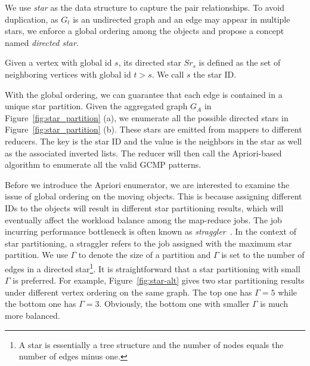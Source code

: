 We use \emph{star} as the data structure to capture the pair relationships. 
To avoid duplication, as $G_t$ is an undirected graph and an edge may appear in multiple stars, 
we enforce a global ordering among the objects and propose a concept named \textit{directed star}.

\begin{definition}
Given a vertex with global id $s$, its directed star $Sr_s$ is defined as the set of neighboring vertices with global id $t>s$. We call $s$ the star ID.
\end{definition}

With the global ordering, we can guarantee that each edge is contained in a unique star partition. Given the aggregated graph $G_A$  in Figure~\ref{fig:star_partition} (a), we enumerate all the possible directed stars in Figure~\ref{fig:star_partition} (b). These stars are emitted from mappers to different reducers. The key is the star ID and the value is the neighbors in the star as well as the associated inverted lists. 
The reducer will then call the Apriori-based algorithm to enumerate all the valid GCMP patterns.


Before we introduce the Apriori enumerator, we are interested to 
examine the issue of global ordering on the moving objects.
This is because assigning different IDs to the objects will result in 
different star partitioning results, which will eventually affect the workload 
balance among the map-reduce jobs. The job incurring performance bottleneck is often known as \emph{straggler}~\cite{kwon2012skewtune,xin2013shark,coppa2015data}. In the context of star partitioning, a straggler refers to the job assigned with the maximum star partition. We use $\Gamma$ to denote the size of a partition and $\Gamma$ is set to the number of edges in a directed star\footnote{A star is essentially a tree structure and the number of nodes equals the number of edges minus one.}. It is straightforward that a star partitioning with small $\Gamma$ is preferred. For example, Figure~\ref{fig:star-alt} gives two star partitioning results under 
different vertex ordering on the same graph. The top one has $\Gamma = 5$ while the bottom one has $\Gamma = 3$. Obviously, the bottom one with smaller $\Gamma$ is much more balanced.



